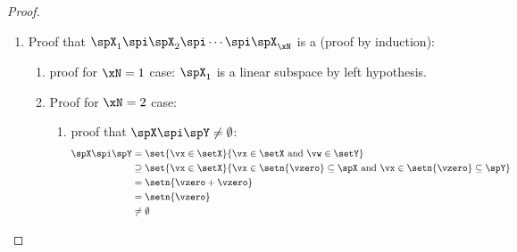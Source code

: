 \begin{proof}
\begin{enumerate}
\begin{enumerate}
\begin{enumerate}
          \item proof that $\vv\in\spX_1\adds\spX_2,\alpha\in F \quad\implies\quad \alpha\vv\in\spX_1\adds\spX_2$:
            \begin{align*}
              \alpha\vx
                &= \alpha(\vv_1 + \vw_1)
                && \text{by $\vx\in\spX_1\adds\spX_2$ hypothesis}
              \\&= \mcomr{\alpha\vv_1}{in $\spX_1$} +
                   \mcoml{\alpha\vw_1}{in $\spX_2$ because $\spX_2$ is a linear subspace}
                && \ifdochas{vector}{\text{by \prefp{def:vspace}}}
              \\&\in \set{\vv+\vw}{\vv\in\spX_1 \text{ and } \vw\in\setY}
              \\&= \spX_1\adds\spX_2
                && \text{by \prefp{def:sub_add}}
            \end{align*}
        \end{enumerate}

      \item Proof that [$\xN$ case] $\implies$ [$\xN+1$ case]:
        \begin{align*}
          \spX_1\adds\spX_2\adds\cdots\adds\spX_{\xN+1}
            &= \mcomr{\brp{\spX_1\adds\spX_2\adds\cdots\adds\spX_{\xN}}}{linear subspace by $\xN$ case hypothsis}\adds\spX_{\xN+1}
            && %
          \\&\implies \text{linear subspace by $\xN=2$ case \xref{item:lsub_adds_n2}}
        \end{align*}
    \end{enumerate}

  \item Proof that $\spX_1\spi\spX_2\spi\cdots\spi\spX_\xN$ is a  (proof by induction):
    \begin{enumerate}
      \item proof for $\xN=1$ case: $\spX_1$ is a linear subspace by left hypothesis.

      \item Proof for $\xN=2$ case: \label{item:lsub_spi_n2}
        \begin{enumerate}
          \item proof that $\spX\spi \spY \ne  \emptyset$:
            \begin{align*}
                \spX\spi \spY
                  &= \set{\vx\in\setX}{\vx\in\setX \text{ and } \vw\in\setY}
                  && %
                \\&\supseteq \set{\vx\in\setX}{\vx\in\setn{\vzero}\subseteq\spX \text{ and } \vx\in\setn{\vzero}\subseteq\spY}
                \\&= \setn{\vzero+\vzero}
                \\&= \setn{\vzero}
                \\&\ne  \emptyset
            \end{align*}


\end{enumerate}
\end{enumerate}
\end{enumerate}
\end{proof}
